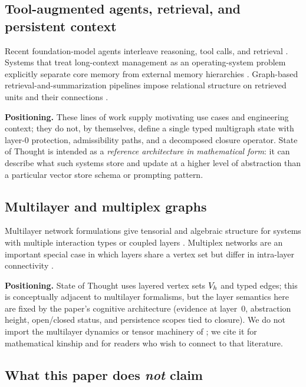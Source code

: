 \subsection{Tool-augmented agents, retrieval, and persistent context}
\label{subsec:rel-agents}

Recent foundation-model agents interleave reasoning, tool calls, and retrieval \citep{yao2023react,qin2024toollearning}.
Systems that treat long-context management as an operating-system problem explicitly separate core memory from external memory hierarchies \citep{packer2024memgpt}.
Graph-based retrieval-and-summarization pipelines impose relational structure on retrieved units and their connections \citep{edge2025graphrag}.

\textbf{Positioning.}
These lines of work supply motivating use cases and engineering context; they do not, by themselves, define a single typed multigraph state with layer-0 protection, admissibility paths, and a decomposed closure operator.
State of Thought is intended as a \emph{reference architecture in mathematical form}: it can describe what such systems store and update at a higher level of abstraction than a particular vector store schema or prompting pattern.

\subsection{Multilayer and multiplex graphs}
\label{subsec:rel-multilayer}

Multilayer network formulations give tensorial and algebraic structure for systems with multiple interaction types or coupled layers \citep{dedomenico2013multilayer}.
Multiplex networks are an important special case in which layers share a vertex set but differ in intra-layer connectivity \citep{gomez2013multiplex}.

\textbf{Positioning.}
State of Thought uses layered vertex sets $V_{h}$ and typed edges; this is conceptually adjacent to multilayer formalisms, but the layer semantics here are fixed by the paper's cognitive architecture (evidence at layer~$0$, abstraction height, open/closed status, and persistence scopes tied to closure).
We do not import the multilayer dynamics or tensor machinery of \citet{dedomenico2013multilayer}; we cite it for mathematical kinship and for readers who wish to connect to that literature.

\subsection{What this paper does \emph{not} claim}
\label{subsec:rel-niche}

